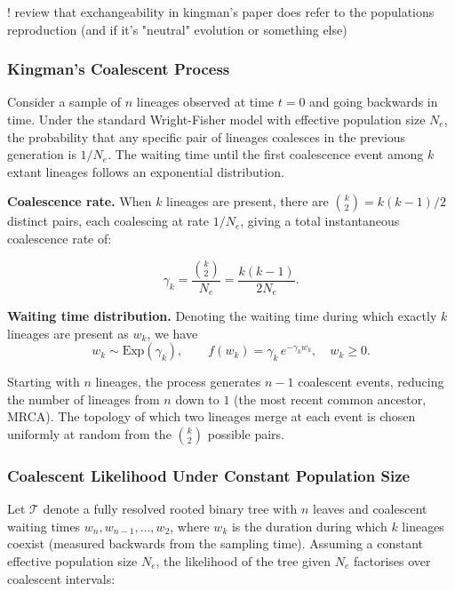 \documentclass[11pt, a4paper]{article}
\begin{document}
! review that exchangeability in kingman's paper does refer to the populations reproduction (and if it's "neutral" evolution or something else) 
\subsubsection{Kingman's Coalescent Process}

Consider a sample of $n$ lineages observed at time $t = 0$ and going backwards in time. Under the standard Wright-Fisher model with effective population size $N_e$, the probability that any specific pair of lineages coalesces in the previous generation
is $1/N_e$. The waiting time until the first coalescence event among $k$ extant lineages follows an
exponential distribution.

\medskip
\noindent\textbf{Coalescence rate.}
When $k$ lineages are present, there are $\binom{k}{2} = k(k-1)/2$ distinct pairs,
each coalescing at rate $1/N_e$, giving a total instantaneous coalescence rate of: 

\begin{equation}
    \gamma_k = \frac{\binom{k}{2}}{N_e} = \frac{k(k-1)}{2N_e}.
    \label{eq:coalrate}
\end{equation}

\noindent\textbf{Waiting time distribution.}
Denoting the waiting time during which exactly $k$ lineages are present as $w_k$,
we have
\begin{equation}
    w_k \sim \mathrm{Exp}\!\left(\gamma_k\right),
    \qquad
    f(w_k) = \gamma_k\, e^{-\gamma_k w_k},
    \quad w_k \geq 0.
    \label{eq:waitingtime}
\end{equation}

Starting with $n$ lineages, the process generates $n - 1$ coalescent events, reducing
the number of lineages from $n$ down to $1$ (the most recent common ancestor, MRCA).
The topology of which two lineages merge at each event is chosen uniformly at random
from the $\binom{k}{2}$ possible pairs.

\subsubsection{Coalescent Likelihood Under Constant Population Size}

Let $\mathcal{T}$ denote a fully resolved rooted binary tree with $n$ leaves and
coalescent waiting times $w_n, w_{n-1}, \ldots, w_2$, where $w_k$ is the duration
during which $k$ lineages coexist (measured backwards from the sampling time).
Assuming a constant effective population size $N_e$, the likelihood of the tree
given $N_e$ factorises over coalescent intervals:
\end{document}
